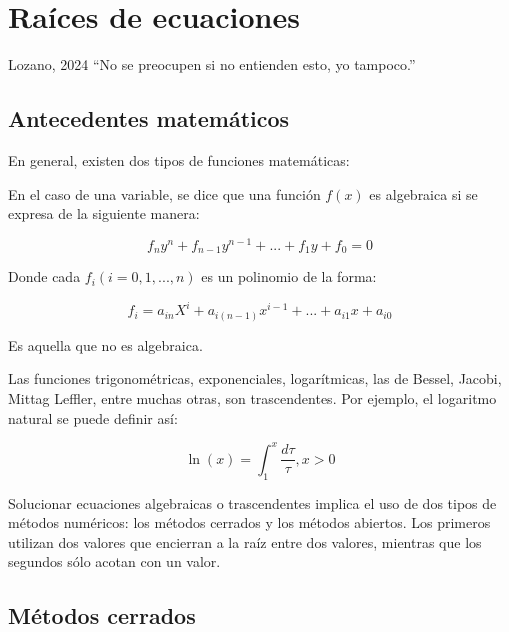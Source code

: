\chapter{Raíces de ecuaciones}

\begin{chapquote}{Lozano, 2024}
    ``No se preocupen si no entienden esto, yo tampoco.''
\end{chapquote}


\section{Antecedentes matemáticos}

En general, existen dos tipos de funciones matemáticas:

\begin{definition}
	En el caso de una variable, se dice que una función \(f(x)\) es
	algebraica si se expresa de la siguiente manera:

	\[
		f_n y^n + f_{n-1} y^{n-1} + ... + f_1 y + f_0 = 0
	\]

	Donde cada \(f_i (i = 0, 1, ..., n)\) es un polinomio de la forma:

	\[
		f_i = a_{in} X^i + a_{i(n-1)} x^{i-1} + ... + a_{i1} x + a_{i0}
	\]
\end{definition}

\begin{definition}
	Es aquella que no es algebraica.
\end{definition}

\begin{eg}
	Las funciones trigonométricas, exponenciales, logarítmicas, las de
	Bessel, Jacobi, Mittag Leffler, entre muchas otras, son trascendentes.
	Por ejemplo, el logaritmo natural se puede definir así:

	\[
		\boxed{\ln(x) = \int_1^x \frac{d \tau}{\tau}, x > 0}
	\]

\end{eg}

Solucionar ecuaciones algebraicas o trascendentes implica el uso de dos tipos
de métodos numéricos: los métodos cerrados y los métodos abiertos. Los primeros
utilizan dos valores que encierran a la raíz entre dos valores, mientras que
los segundos sólo acotan con un valor.

\section{Métodos cerrados}

